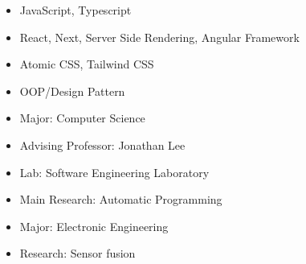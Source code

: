 \documentclass[10pt,a4paper,ragged2e]{altacv}
\begin{document}
\begin{itemize}
    \item JavaScript, Typescript
    \item React, Next, Server Side Rendering, Angular Framework
    \item Atomic CSS, Tailwind CSS
    \item OOP/Design Pattern
\end{itemize}



\begin{itemize}
\item Major: Computer Science
\item Advising Professor: Jonathan Lee
\item Lab: Software Engineering Laboratory
\item Main Research: Automatic Programming
\end{itemize}

\divider

\begin{itemize}
\item Major: Electronic Engineering
\item Research: Sensor fusion

\end{itemize}
\end{document}
